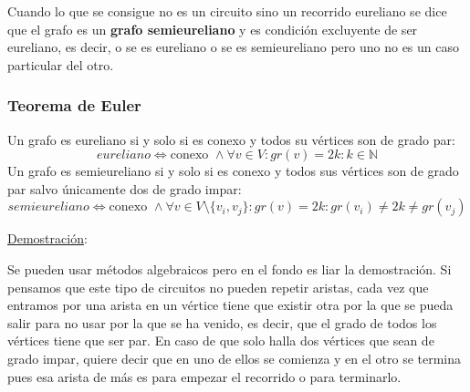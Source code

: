 \documentclass[10pt,a4paper,openright]{book}
\begin{document}
Cuando lo que se consigue no es un circuito sino un recorrido eureliano se dice que el grafo es un \textbf{grafo semieureliano} y es condición excluyente de ser eureliano, es decir, o se es eureliano o se es semieureliano pero uno no es un caso particular del otro.

\subsubsection*{Teorema de Euler}
Un grafo es eureliano si y solo si es conexo y todos su vértices son de grado par:
$$eureliano \Leftrightarrow \mbox{conexo }\wedge \forall v\in V: gr(v)=2k: k\in \mathbb N$$
Un grafo es semieureliano si y solo si es conexo y todos sus vértices son de grado par salvo únicamente dos de grado impar:
$$semieureliano \Leftrightarrow \mbox{conexo }\wedge \forall v\in V\mbox{\textbackslash}\{v_i, v_j\}: gr(v)=2k: gr(v_i)\neq 2k \neq gr(v_j)$$

\underline{Demostración}:

Se pueden usar métodos algebraicos pero en el fondo es liar la demostración. Si pensamos que este tipo de circuitos no pueden repetir aristas, cada vez que entramos por una arista en un vértice tiene que existir otra por la que se pueda salir para no usar por la que se ha venido, es decir, que el grado de todos los vértices tiene que ser par. En caso de que solo halla dos vértices que sean de grado impar, quiere decir que en uno de ellos se comienza y en el otro se termina pues esa arista de más es para empezar el recorrido o para terminarlo.
\end{document}
